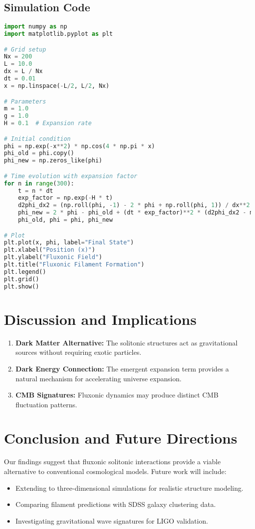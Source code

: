 \documentclass{article}
\begin{document}
\subsection{Simulation Code}
\begin{lstlisting}[language=Python, caption=Fluxonic Filament Formation, label=lst:filament]
import numpy as np
import matplotlib.pyplot as plt

# Grid setup
Nx = 200
L = 10.0
dx = L / Nx
dt = 0.01
x = np.linspace(-L/2, L/2, Nx)

# Parameters
m = 1.0
g = 1.0
H = 0.1  # Expansion rate

# Initial condition
phi = np.exp(-x**2) * np.cos(4 * np.pi * x)
phi_old = phi.copy()
phi_new = np.zeros_like(phi)

# Time evolution with expansion factor
for n in range(300):
    t = n * dt
    exp_factor = np.exp(-H * t)
    d2phi_dx2 = (np.roll(phi, -1) - 2 * phi + np.roll(phi, 1)) / dx**2
    phi_new = 2 * phi - phi_old + (dt * exp_factor)**2 * (d2phi_dx2 - m**2 * phi - g * phi**3)
    phi_old, phi = phi, phi_new

# Plot
plt.plot(x, phi, label="Final State")
plt.xlabel("Position (x)")
plt.ylabel("Fluxonic Field")
plt.title("Fluxonic Filament Formation")
plt.legend()
plt.grid()
plt.show()
\end{lstlisting}

\section{Discussion and Implications}
\begin{enumerate}
    \item \textbf{Dark Matter Alternative:} The solitonic structures act as gravitational sources without requiring exotic particles.
    \item \textbf{Dark Energy Connection:} The emergent expansion term provides a natural mechanism for accelerating universe expansion.
    \item \textbf{CMB Signatures:} Fluxonic dynamics may produce distinct CMB fluctuation patterns.
\end{enumerate}

\section{Conclusion and Future Directions}
Our findings suggest that fluxonic solitonic interactions provide a viable alternative to conventional cosmological models. Future work will include:
\begin{itemize}
    \item Extending to three-dimensional simulations for realistic structure modeling.
    \item Comparing filament predictions with SDSS galaxy clustering data.
    \item Investigating gravitational wave signatures for LIGO validation.
\end{itemize}
\end{document}
